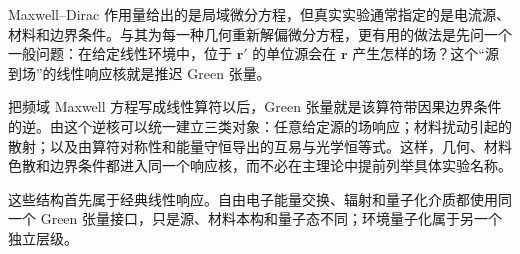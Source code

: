 Maxwell--Dirac 作用量给出的是局域微分方程，但真实实验通常指定的是电流源、材料和边界条件。与其为每一种几何重新解偏微分方程，更有用的做法是先问一个一般问题：在给定线性环境中，位于 $\mathbf r'$ 的单位源会在 $\mathbf r$ 产生怎样的场？这个“源到场”的线性响应核就是推迟 Green 张量。

把频域 Maxwell 方程写成线性算符以后，Green 张量就是该算符带因果边界条件的逆。由这个逆核可以统一建立三类对象：任意给定源的场响应；材料扰动引起的散射；以及由算符对称性和能量守恒导出的互易与光学恒等式。这样，几何、材料色散和边界条件都进入同一个响应核，而不必在主理论中提前列举具体实验名称。

这些结构首先属于经典线性响应。自由电子能量交换、辐射和量子化介质都使用同一个 Green 张量接口，只是源、材料本构和量子态不同；环境量子化属于另一个独立层级。





